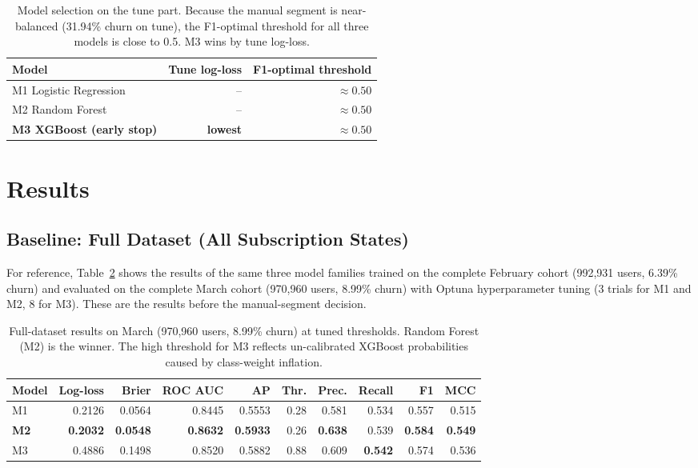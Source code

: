 \documentclass{article}
\begin{document}
\begin{table}[H]
\centering
\renewcommand{\arraystretch}{1.2}
\begin{tabular}{lrr}
\toprule
\textbf{Model} & \textbf{Tune log-loss} & \textbf{F1-optimal threshold} \\
\midrule
M1 Logistic Regression & -- & $\approx 0.50$ \\
M2 Random Forest & -- & $\approx 0.50$ \\
\textbf{M3 XGBoost (early stop)} & \textbf{lowest} & $\approx 0.50$ \\
\bottomrule
\end{tabular}
\caption{Model selection on the tune part. Because the manual segment is near-balanced (31.94\% churn on tune), the F1-optimal threshold for all three models is close to 0.5. M3 wins by tune log-loss.}
\label{tab:w1_select}
\end{table}


\section{Results}\label{sec:results}

\subsection{Baseline: Full Dataset (All Subscription States)}

For reference, Table~\ref{tab:w1_results_full} shows the results of the same three model families trained on the complete February cohort (992{,}931 users, 6.39\% churn) and evaluated on the complete March cohort (970{,}960 users, 8.99\% churn) with Optuna hyperparameter tuning (3 trials for M1 and M2, 8 for M3). These are the results before the manual-segment decision.

\begin{table}[H]
\centering
\small
\renewcommand{\arraystretch}{1.2}
\begin{tabular}{lrrrrrrrrr}
\toprule
\textbf{Model} & \textbf{Log-loss} & \textbf{Brier} & \textbf{ROC AUC} & \textbf{AP} & \textbf{Thr.} & \textbf{Prec.} & \textbf{Recall} & \textbf{F1} & \textbf{MCC} \\
\midrule
M1 & 0.2126 & 0.0564 & 0.8445 & 0.5553 & 0.28 & 0.581 & 0.534 & 0.557 & 0.515 \\
\textbf{M2} & \textbf{0.2032} & \textbf{0.0548} & \textbf{0.8632} & \textbf{0.5933} & 0.26 & \textbf{0.638} & 0.539 & \textbf{0.584} & \textbf{0.549} \\
M3 & 0.4886 & 0.1498 & 0.8520 & 0.5882 & 0.88 & 0.609 & \textbf{0.542} & 0.574 & 0.536 \\
\bottomrule
\end{tabular}
\caption{Full-dataset results on March (970{,}960 users, 8.99\% churn) at tuned thresholds. Random Forest (M2) is the winner. The high threshold for M3 reflects un-calibrated XGBoost probabilities caused by class-weight inflation.}
\label{tab:w1_results_full}
\end{table}
\end{document}
